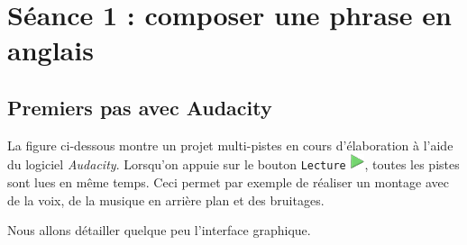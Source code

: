 %
%
%
%

\newpage

\section{Séance 1 : composer une phrase en anglais}\label{ficheSon5e1}


\subsection{Premiers pas avec Audacity}\label{Son1Interface}

La figure ci-dessous montre un projet multi-pistes en cours d'élaboration à l'aide du logiciel \emph{Audacity}. Lorsqu'on appuie sur le bouton \texttt{Lecture} \includegraphics[width=.4cm]{./images/son01/boutonPlay}, toutes les pistes sont lues en même temps. Ceci permet par exemple de réaliser un montage avec de la voix, de la musique en arrière plan et des bruitages.


Nous allons détailler quelque peu l'interface graphique.\\

